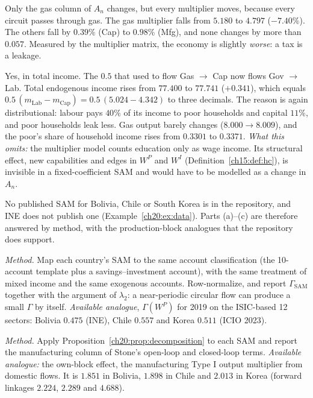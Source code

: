 \documentclass[../solutions_manual.tex]{subfiles}
\begin{document}
 Only the gas column of $A_n$ changes, but every multiplier moves, because every circuit passes through gas. The gas multiplier falls from $5.180$ to $4.797$ ($-7.40\%$). The others fall by $0.39\%$ (Cap) to $0.98\%$ (Mfg), and none changes by more than $0.057$. Measured by the multiplier matrix, the economy is slightly \emph{worse}: a tax is a leakage.

 Yes, in total income. The $0.5$ that used to flow Gas $\to$ Cap now flows Gov $\to$ Lab. Total endogenous income rises from $77.400$ to $77.741$ ($+0.341$), which equals $0.5\,(m_{\text{Lab}} - m_{\text{Cap}}) = 0.5\,(5.024 - 4.342)$ to three decimals. The reason is again distributional: labour pays $40\%$ of its income to poor households and capital $11\%$, and poor households leak less. Gas output barely changes ($8.000 \to 8.009$), and the poor's share of household income rises from $0.3301$ to $0.3371$. \emph{What this omits:} the multiplier model counts education only as wage income. Its structural effect, new capabilities and edges in $W^P$ and $W^I$ (Definition~\ref{ch15:def:hc}), is invisible in a fixed-coefficient SAM and would have to be modelled as a change in $A_n$.


 No published SAM for Bolivia, Chile or South Korea is in the repository, and INE does not publish one (Example~\ref{ch20:ex:data}). Parts (a)--(c) are therefore answered by method, with the production-block analogues that the repository does support.

 \emph{Method.} Map each country's SAM to the same account classification (the 10-account template plus a savings--investment account), with the same treatment of mixed income and the same exogenous accounts. Row-normalize, and report $\Gamma_{\text{SAM}}$ together with the argument of $\lambda_2$: a near-periodic circular flow can produce a small $\Gamma$ by itself. \emph{Available analogue}, $\Gamma(W^P)$ for 2019 on the ISIC-based 12 sectors: Bolivia $0.475$ (INE), Chile $0.557$ and Korea $0.511$ (ICIO 2023).

 \emph{Method.} Apply Proposition~\ref{ch20:prop:decomposition} to each SAM and report the manufacturing column of Stone's open-loop and closed-loop terms. \emph{Available analogue:} the own-block effect, the manufacturing Type I output multiplier from domestic flows. It is $1.851$ in Bolivia, $1.898$ in Chile and $2.013$ in Korea (forward linkages $2.224$, $2.289$ and $4.688$).
\end{document}
